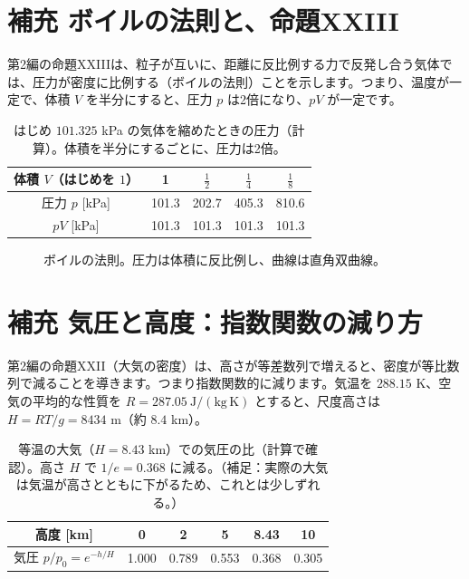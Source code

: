 \documentclass[a4paper,11pt,openany]{ltjsbook}
\begin{document}
\section{補充 ボイルの法則と、命題XXIII}

第2編の命題XXIIIは、粒子が互いに、距離に反比例する力で反発し合う気体では、圧力が密度に比例する（ボイルの法則）ことを示します。つまり、温度が一定で、体積 $V$ を半分にすると、圧力 $p$ は2倍になり、$pV$ が一定です。

\begin{table}[htbp]
\centering
\begin{tabular}{c|cccc}
\toprule
体積 $V$（はじめを $1$） & 1 & $\tfrac12$ & $\tfrac14$ & $\tfrac18$\\
\midrule
圧力 $p$ [kPa] & 101.3 & 202.7 & 405.3 & 810.6\\
$pV$ [kPa] & 101.3 & 101.3 & 101.3 & 101.3\\
\bottomrule
\end{tabular}
\caption{はじめ $101.325$ kPa の気体を縮めたときの圧力（計算）。体積を半分にするごとに、圧力は2倍。}
\end{table}

\begin{figure}[htbp]
\centering
{}
\caption{ボイルの法則。圧力は体積に反比例し、曲線は直角双曲線。}
\end{figure}

\section{補充 気圧と高度：指数関数の減り方}

第2編の命題XXII（大気の密度）は、高さが等差数列で増えると、密度が等比数列で減ることを導きます。つまり指数関数的に減ります。気温を $288.15$ K、空気の平均的な性質を $R=287.05\ \mathrm{J/(kg\,K)}$ とすると、尺度高さは $H=RT/g=8434$ m（約 $8.4$ km）。

\begin{table}[htbp]
\centering
\begin{tabular}{c|ccccc}
\toprule
高度 [km] & 0 & 2 & 5 & 8.43 & 10\\
\midrule
気圧 $p/p_0=e^{-h/H}$ & 1.000 & 0.789 & 0.553 & 0.368 & 0.305\\
\bottomrule
\end{tabular}
\caption{等温の大気（$H=8.43$ km）での気圧の比（計算で確認）。高さ $H$ で $1/e=0.368$ に減る。（補足：実際の大気は気温が高さとともに下がるため、これとは少しずれる。）}
\end{table}
\end{document}

